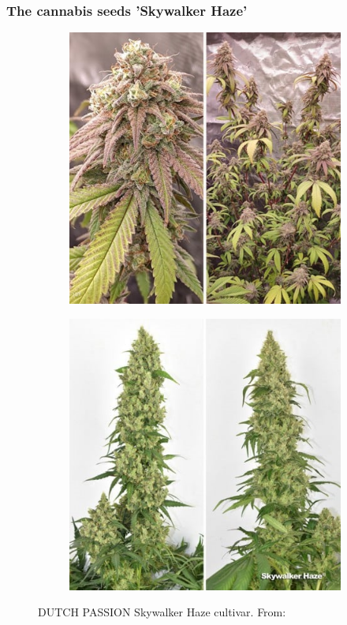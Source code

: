 \documentclass[
    12pt,
    aspectratio=1610,
    bibliography=../bibliography.bib,
    link-citations]{beamer}
\begin{document}
    \begin{frame}
        \frametitle{The cannabis seeds 'Skywalker Haze'}
        \begin{figure}
            \begin{subfigure}[t]{.48\textwidth}
                \includegraphics[width=\linewidth]{DUTCH-PASSION_Skywalker-Haze_1}
            \end{subfigure}
            \hfill
            \begin{subfigure}[t]{.48\textwidth}
                \includegraphics[width=\linewidth]{DUTCH-PASSION_Skywalker-Haze_2}
            \end{subfigure}
            \caption{DUTCH PASSION Skywalker Haze cultivar. From: \textcite{noauthor_dutch-passion_skywalker-haze_nodate}}
        \end{figure}
    \end{frame}
\end{document}
